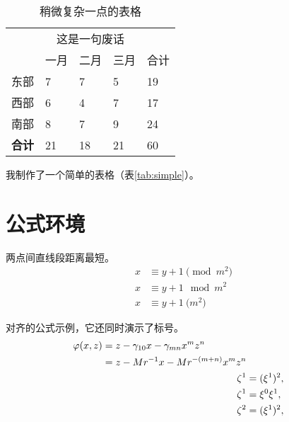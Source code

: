         \begin{table}[!ht]
          \centering
          \caption{稍微复杂一点的表格}
          \label{tab:complex}
          \wuhao
          \begin{tabularx}{\linewidth}{XXXXX} \toprule 
                & \multicolumn{3}{c}{这是一句废话} &  \\ \cmidrule{2-4}
                & 一月 & 二月 & 三月 & 合计 \\ \midrule
           东部 &    7 &    7 &    5 &   19 \\ 
           西部 &    6 &    4 &    7 &   17 \\ 
           南部 &    8 &    7 &    9 &   24 \\ 
       \bf 合计 &   21 &   18 &   21 &   60 \\ \bottomrule
          \end{tabularx}
        \end{table}

        我制作了一个简单的表格（表\ref{tab:simple}）。


\chapter{公式环境}

    \begin{axiom}
        \rm 两点间直线段距离最短。  
        \begin{align}
            x&\equiv y+1\pmod{m^2}\\
            x&\equiv y+1\mod{m^2}\\
            x&\equiv y+1\pod{m^2}
        \end{align}
    \end{axiom}

    \begin{remark}
    \rm 对齐的公式示例，它还同时演示了标号。
    \begin{align}
    \begin{split} 
    \varphi(x,z)
    &=z-\gamma_{10}x-\gamma_{mn}x^mz^n\\
    &=z-Mr^{-1}x-Mr^{-(m+n)}x^mz^n
    \end{split} \notag \\
    \noindent\zeta^1&=(\xi^1)^2,\\
    \zeta^1 &=\xi^0\xi^1,\\
    \zeta^2 &=(\xi^1)^2,
    \end{align}
    \end{remark}


